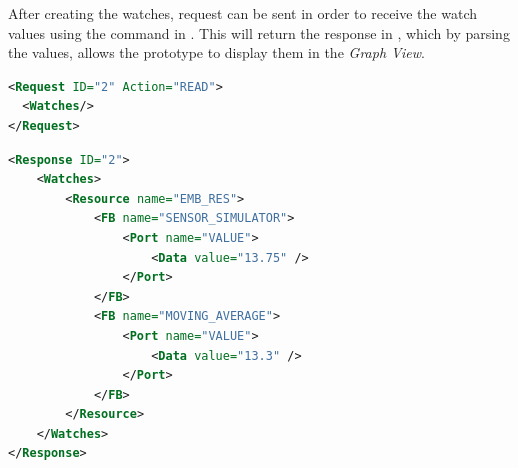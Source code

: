 After creating the watches, request can be sent in order to receive the watch values using the command in . This will return the response in , which by parsing the values, allows the prototype to display them in the \textit{Graph View}.

\begin{lstlisting}[language=XML, caption={Request to \texttt{READ} watches}, label={lst:deploy-read-watch}]
<Request ID="2" Action="READ">
  <Watches/>
</Request>
\end{lstlisting}

\begin{lstlisting}[language=XML, caption={Response to \texttt{READ} watches}, label={lst:deploy-watch}]
<Response ID="2">
	<Watches>
		<Resource name="EMB_RES">
			<FB name="SENSOR_SIMULATOR">
				<Port name="VALUE">
					<Data value="13.75" />
				</Port>
			</FB>
			<FB name="MOVING_AVERAGE">
				<Port name="VALUE">
					<Data value="13.3" />
				</Port>
			</FB>
		</Resource>
	</Watches>
</Response>
\end{lstlisting}
